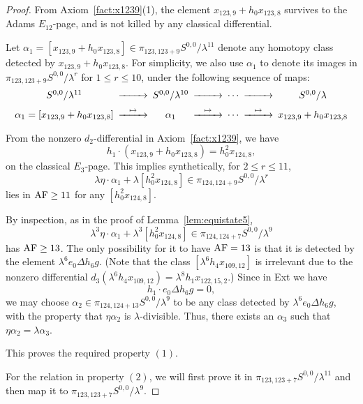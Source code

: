\begin{proof}
From Axiom~\ref{fact:x1239}(1), the element $x_{123,9}+h_0x_{123,8}$ survives to the Adams $E_{12}$-page, and is not killed by any classical differential.

Let $\alpha_1 = [x_{123,9}+h_0x_{123,8}] \in \pi_{123,123+9} S^{0,0}/\lambda^{11}$ denote any homotopy class detected by $x_{123,9}+h_0x_{123,8}$. For simplicity, we also use  $\alpha_1$ to denote its images in $\pi_{123,123+9} S^{0,0}/\lambda^r$ for $1 \leq r \leq 10$, under the following sequence of maps:
$$
\begin{CD}
S^{0,0}/\lambda^{11} @>>> S^{0,0}/\lambda^{10} @>>> \cdots @>>> S^{0,0}/\lambda \\
\alpha_1 = [x_{123,9}+h_0x_{123,8}] @>{\mapsto}>> \alpha_1 @>{\mapsto}>> \cdots @>{\mapsto}>> x_{123,9}+h_0x_{123,8}
\end{CD}$$

From the nonzero $d_2$-differential in Axiom~\ref{fact:x1239},  we have 
$$h_1 \cdot (x_{123,9}+h_0x_{123,8}) = h_0^2x_{124,8},$$
on the classical $E_3$-page. This implies synthetically, for $2 \leq r \leq 11$,
$$\lambda \eta \cdot \alpha_1 + \lambda [h_0^2 x_{124,8}] \in \pi_{124,124+9} S^{0,0}/\lambda^r$$
lies in $\mathrm{AF} \ge 11$ for any $[h_0^2 x_{124,8}]$.


By inspection, as in the proof of Lemma~\ref{lem:equistate5}, $$\lambda^3 \eta \cdot \alpha_1 + \lambda^3 [h_0^2 x_{124,8}] \in \pi_{124,124+7} S^{0,0}/\lambda^9$$
has $\mathrm{AF} \ge 13$. The only possibility for it to have $\mathrm{AF}=13$ is that it is detected by the element $\lambda^6 e_0 \Delta h_6g$. (Note that the class $[\lambda^6 h_4 x_{109,12}]$ is irrelevant due to the nonzero differential $d_3(\lambda^6 h_4 x_{109,12}) = \lambda^8 h_1x_{122,15,2}$.) Since in Ext we have 
$$h_1 \cdot e_0 \Delta h_6g = 0,$$
we may choose $\alpha_2 \in \pi_{124,124+13} S^{0,0}/\lambda^9$ to be any class detected by $\lambda^6 e_0 \Delta h_6g$, with the property that $\eta \alpha_2$ is $\lambda$-divisible. Thus, there exists an $\alpha_3$ such that $\eta \alpha_2 = \lambda  \alpha_3$.

This proves the required property $(1)$.

For the relation in property $(2)$, we will first prove it in $\pi_{123,123+7} S^{0,0}/\lambda^{11}$ and then map it to $\pi_{123,123+7} S^{0,0}/\lambda^9$.


\end{proof}
